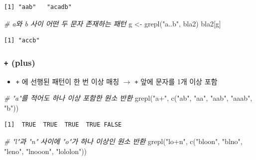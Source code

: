 \documentclass[
  11pt,
]{krantz}
\newenvironment{Shaded}{\begin{snugshade}}{\end{snugshade}}
\newcommand{\CommentTok}[1]{\textcolor[rgb]{0.37,0.37,0.37}{\textit{#1}}}
\newcommand{\FunctionTok}[1]{\textcolor[rgb]{0,0,0}{#1}}
\newcommand{\NormalTok}[1]{#1}
\newcommand{\OtherTok}[1]{\textcolor[rgb]{0.37,0.37,0.37}{#1}}
\newcommand{\StringTok}[1]{\textcolor[rgb]{0.5,0.5,0.5}{#1}}
\providecommand{\tightlist}{%
  \setlength{\itemsep}{0pt}\setlength{\parskip}{0pt}}
\begin{document}
\begin{verbatim}
[1] "aab"   "acadb"
\end{verbatim}

\begin{Shaded}
\begin{Highlighting}[]
\CommentTok{\# a와 b 사이 어떤 두 문자 존재하는 패턴}
\NormalTok{g }\OtherTok{\textless{}{-}} \FunctionTok{grepl}\NormalTok{(}\StringTok{"a..b"}\NormalTok{, bla2)}
\NormalTok{bla2[g]}
\end{Highlighting}
\end{Shaded}

\begin{verbatim}
[1] "accb"
\end{verbatim}

\normalsize

\hypertarget{plus}{%
\subsubsection*{\texorpdfstring{\textbf{\texttt{+} (plus)}}{+ (plus)}}\label{plus}}


\begin{itemize}
\tightlist
\item
  \texttt{+} 에 선행된 패턴이 한 번 이상 매칭 \(\rightarrow\) \texttt{+} 앞에 문자를 1개 이상 포함
\end{itemize}

\footnotesize

\begin{Shaded}
\begin{Highlighting}[]
\CommentTok{\# "a"를 적어도 하나 이상 포함한 원소 반환}
\FunctionTok{grepl}\NormalTok{(}\StringTok{"a+"}\NormalTok{, }\FunctionTok{c}\NormalTok{(}\StringTok{"ab"}\NormalTok{, }\StringTok{"aa"}\NormalTok{, }\StringTok{"aab"}\NormalTok{, }\StringTok{"aaab"}\NormalTok{, }\StringTok{"b"}\NormalTok{))}
\end{Highlighting}
\end{Shaded}

\begin{verbatim}
[1]  TRUE  TRUE  TRUE  TRUE FALSE
\end{verbatim}

\begin{Shaded}
\begin{Highlighting}[]
\CommentTok{\# "l"과 "n" 사이에 "o"가 하나 이상인 원소 반환}
\FunctionTok{grepl}\NormalTok{(}\StringTok{"lo+n"}\NormalTok{, }\FunctionTok{c}\NormalTok{(}\StringTok{"bloon"}\NormalTok{, }\StringTok{"blno"}\NormalTok{, }\StringTok{"leno"}\NormalTok{, }\StringTok{"lnooon"}\NormalTok{, }\StringTok{"lololon"}\NormalTok{))}
\end{Highlighting}
\end{Shaded}
\end{document}
